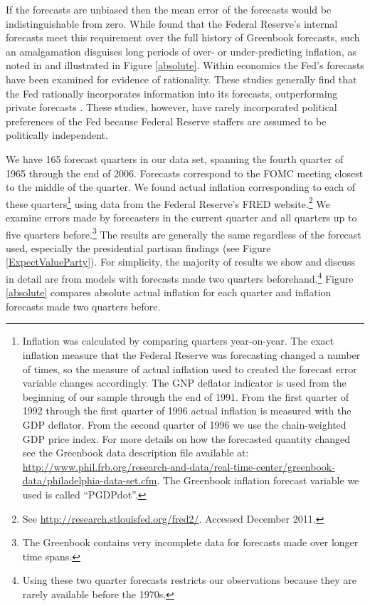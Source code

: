 \documentclass[a4paper]{article}\usepackage{graphicx, color}
\begin{document}
If the forecasts are unbiased then the mean error of the forecasts would be indistinguishable from zero. While \cite{Romer2000} found that the Federal Reserve's internal forecasts  meet this requirement over the full history of Greenbook forecasts, such an amalgamation disguises long periods of over- or under-predicting inflation, as noted in \cite{Capistran2006} and illustrated in Figure \ref{absolute}. Within economics the Fed's forecasts have been examined for evidence of rationality. These studies generally find that the Fed rationally incorporates information into its forecasts, outperforming private forecasts \cite[c.f.][]{Gamber2009}. These studies, however, have rarely incorporated political preferences of the Fed because Federal Reserve staffers are assumed to be politically independent.

We have 165 forecast quarters in our data set, spanning the fourth quarter of 1965 through the end of 2006. Forecasts correspond to the FOMC meeting closest to the middle of the quarter. We found actual inflation corresponding to each of these quarters\footnote{Inflation was calculated by comparing quarters year-on-year. The exact inflation measure that the Federal Reserve was forecasting changed a number of times, so the measure of actual inflation used to created the forecast error variable changes accordingly. The GNP deflator indicator is used from the beginning of our sample through the end of 1991. From the first quarter of 1992 through the first quarter of 1996 actual inflation is measured with the GDP deflator. From the second quarter of 1996 we use the chain-weighted GDP price index. For more details on how the forecasted quantity changed see the Greenbook data description file available at: \url{http://www.phil.frb.org/research-and-data/real-time-center/greenbook-data/philadelphia-data-set.cfm}. The Greenbook inflation forecast variable we used is called ``PGDPdot''.} using data from the Federal Reserve's FRED website.\footnote{See \url{http://research.stlouisfed.org/fred2/}. Accessed December 2011.} We examine errors made by forecasters in the current quarter and all quarters up to five quarters before.\footnote{The Greenbook contains very incomplete data for forecasts made over longer time spans.} The results are generally the same regardless of the forecast used, especially the presidential partisan findings (see Figure \ref{ExpectValueParty}). For simplicity, the majority of results we show and discuss in detail are from models with forecasts made two quarters beforehand.\footnote{Using these two quarter forecasts restricts our observations because they are rarely available before the 1970s.} Figure \ref{absolute} compares absolute actual inflation for each quarter and inflation forecasts made two quarters before.
\end{document}
